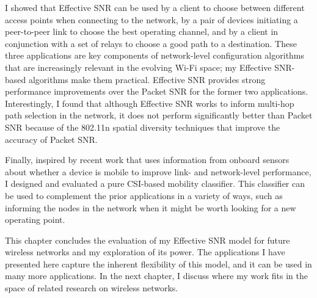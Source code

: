 I showed that Effective SNR can be used by a client to choose between different access points when connecting to the network, by a pair of devices initiating a peer-to-peer link to choose the best operating channel, and by a client in conjunction with a set of relays to choose a good path to a destination. These three applications are key components of network-level configuration algorithms that are increasingly relevant in the evolving Wi-Fi space; my Effective SNR-based algorithms make them practical. Effective SNR provides strong performance improvements over the Packet SNR for the former two applications. Interestingly, I found that although Effective SNR works to inform multi-hop path selection in the network, it does not perform significantly better than Packet SNR because of the 802.11n spatial diversity techniques that improve the accuracy of Packet SNR.

Finally, inspired by recent work that uses information from onboard sensors about whether a device is mobile to improve link- and network-level performance, I designed and evaluated a pure CSI-based mobility classifier. This classifier can be used to complement the prior applications in a variety of ways, such as informing the nodes in the network when it might be worth looking for a new operating point.

This chapter concludes the evaluation of my Effective SNR model for future wireless networks and my exploration of its power. The applications I have presented here capture the inherent flexibility of this model, and it can be used in many more applications. In the next chapter, I discuss where my work fits in the space of related research on wireless networks.


\ifx\mainfile\undefined

\fi